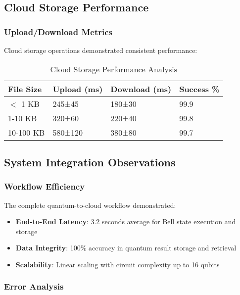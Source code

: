 \documentclass[conference]{IEEEtran}
\begin{document}
\subsection{Cloud Storage Performance}

\subsubsection{Upload/Download Metrics}

Cloud storage operations demonstrated consistent performance:

\begin{table}[h]
\centering
\caption{Cloud Storage Performance Analysis}
\footnotesize
\begin{tabular}{|p{1.5cm}|p{1.8cm}|p{1.8cm}|p{1.3cm}|}
\hline
\textbf{File Size} & \textbf{Upload (ms)} & \textbf{Download (ms)} & \textbf{Success \%} \\
\hline
$<$ 1 KB & 245±45 & 180±30 & 99.9 \\
1-10 KB & 320±60 & 220±40 & 99.8 \\
10-100 KB & 580±120 & 380±80 & 99.7 \\
\hline
\end{tabular}
\end{table}

\subsection{System Integration Observations}

\subsubsection{Workflow Efficiency}

The complete quantum-to-cloud workflow demonstrated:
\begin{itemize}
    \item \textbf{End-to-End Latency}: 3.2 seconds average for Bell state execution and storage
    \item \textbf{Data Integrity}: 100\% accuracy in quantum result storage and retrieval
    \item \textbf{Scalability}: Linear scaling with circuit complexity up to 16 qubits
\end{itemize}

\subsubsection{Error Analysis}
\end{document}

